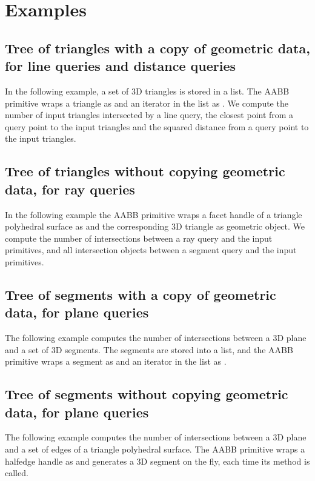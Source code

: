 \section{Examples}
\label{AABB_tree_section_examples}

\subsection{Tree of triangles with a copy of geometric data, for line queries and distance queries}
In the following example, a set of 3D triangles is stored in a list. The AABB primitive wraps a triangle as  and an iterator in the list as . We compute the number of input triangles intersected by a line query, the closest point from a query point to the input triangles and the squared distance from a query point to the input triangles.

\subsection{Tree of triangles without copying geometric data, for ray queries}
In the following example the AABB primitive wraps a facet handle of a triangle polyhedral surface as  and the corresponding 3D triangle as geometric object. We compute the number of intersections between a ray query and the input primitives, and all intersection objects between a segment query and the input primitives. 

\subsection{Tree of segments with a copy of geometric data, for plane queries}
The following example computes the number of intersections between a 3D plane and a set of 3D segments. The segments are stored into a list, and the AABB primitive wraps a segment as  and an iterator in the list as .

\subsection{Tree of segments without copying geometric data, for plane queries}
The following example computes the number of intersections between a 3D plane and a set of edges of a triangle polyhedral surface. The AABB primitive wraps a halfedge handle as  and generates a 3D segment on the fly, each time its method  is called.
